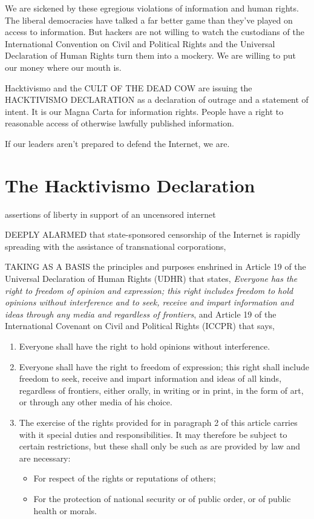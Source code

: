 \documentclass[letterpaper,12pt,english]{sphinxmanual}
\begin{document}
We are sickened by these egregious violations of information and human rights. The liberal democracies have talked a far better game than they've played on access to information. But hackers are not willing to watch the custodians of the International
Convention on Civil and Political Rights and the Universal Declaration of Human Rights turn them into a mockery. We are willing to put our money where our mouth is.

Hacktivismo and the CULT OF THE DEAD COW are issuing the HACKTIVISMO DECLARATION as a declaration of outrage and a statement of intent. It is our Magna Carta for information rights. People have a right to reasonable access of otherwise lawfully published information.

If our leaders aren't prepared to defend the Internet, we are.


\section{The Hacktivismo Declaration}
\label{2001:the-hacktivismo-declaration}
assertions of liberty in support of an uncensored internet

DEEPLY ALARMED that state-sponsored censorship of the Internet is rapidly spreading with the assistance of transnational corporations,

TAKING AS A BASIS the principles and purposes enshrined in Article 19 of the Universal Declaration of Human Rights (UDHR) that states, \emph{Everyone has the right to freedom of opinion and expression; this right includes freedom to hold opinions without interference and to seek, receive and impart information and ideas through any media and regardless of frontiers}, and Article 19 of the International
Covenant on Civil and Political Rights (ICCPR) that says,
\begin{enumerate}
\item {} 
Everyone shall have the right to hold opinions without interference.

\item {} 
Everyone shall have the right to freedom of expression; this right shall include freedom to seek, receive and impart information and ideas of all kinds, regardless of frontiers, either orally, in writing or in print, in the form of art, or through any other media of his choice.

\item {} 
The exercise of the rights provided for in paragraph 2 of this article carries with it special duties and responsibilities. It may therefore be subject to certain restrictions, but these shall only be such as are provided by law and are necessary:
\begin{itemize}
\item {} 
For respect of the rights or reputations of others;

\item {} 
For the protection of national security or of public order, or of public health or morals.

\end{itemize}

\end{enumerate}
\end{document}
